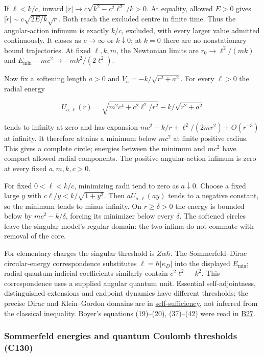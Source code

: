 \documentclass[11pt,a4paper]{article}
\begin{document}
If \(\ell<k/c\), inward \(|\dot r|\to c\sqrt{k^2-c^2\ell^2}/k>0\). At
equality, allowed \(E>0\) gives \(|\dot r|\sim c\sqrt{2E/k}\sqrt r\).
Both reach the excluded centre in finite time. Thus the angular-action
infimum is exactly \(k/c\), excluded, with every larger value admitted
continuously. It closes as \(c\to\infty\) or \(k\downarrow0\); at
\(k=0\) there are no nonstationary bound trajectories. At fixed
\(\ell,k,m\), the Newtonian limits are \(r_0\to\ell^2/(mk)\) and
\(E_{\min}-mc^2\to-mk^2/(2\ell^2)\).

Now fix a softening length \(a>0\) and \(V_a=-k/\sqrt{r^2+a^2}\). For
every \(\ell>0\) the radial energy

\[U_{a,\ell}(r)=\sqrt{m^2c^4+c^2\ell^2/r^2}-k/\sqrt{r^2+a^2}\]

tends to infinity at zero and has expansion
\(mc^2-k/r+\ell^2/(2mr^2)+O(r^{-3})\) at infinity. It therefore attains
a minimum below \(mc^2\) at finite positive radius. This gives a
complete circle; energies between the minimum and \(mc^2\) have compact
allowed radial components. The positive angular-action infimum is zero
at every fixed \(a,m,k,c>0\).

For fixed \(0<\ell<k/c\), minimizing radii tend to zero as
\(a\downarrow0\). Choose a fixed large \(y\) with
\(c\ell/y<k/\sqrt{1+y^2}\). Then \(aU_{a,\ell}(ay)\) tends to a negative
constant, so the minimum tends to minus infinity. On \(r\ge\delta>0\)
the energy is bounded below by \(mc^2-k/\delta\), forcing its minimizer
below every \(\delta\). The softened circles leave the singular model's
regular domain: the two infima do not commute with removal of the core.

For elementary charges the singular threshold is \(Z\alpha\hbar\). The
Sommerfeld--Dirac circular-energy correspondence substitutes
\(\ell=\hbar|\kappa_D|\) into the displayed \(E_{\min}\); radial quantum
indicial coefficients similarly contain \(c^2\ell^2-k^2\). This
correspondence uses a supplied angular quantum unit. Essential
self-adjointness, distinguished extensions and endpoint dynamics have
different thresholds; the precise Dirac and Klein--Gordon domains are in
\href{self-sufficiency-contrast.md}{self-sufficiency}, not inferred from
the classical inequality. Boyer's equations (19)--(20), (37)--(42) were
read in \href{../references/batches/B27.md}{B27}.

\hypertarget{sommerfeld-energies-and-quantum-coulomb-thresholds-c130}{%
\subsubsection{Sommerfeld energies and quantum Coulomb thresholds
(C130)}\label{sommerfeld-energies-and-quantum-coulomb-thresholds-c130}}
\end{document}
